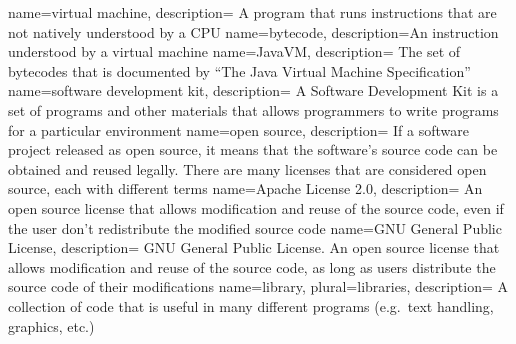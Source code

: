 {
    name={virtual machine},
    description=
    {
        A program that runs instructions that are not natively understood by a
        CPU
    }
}
{
    name=bytecode,
    description={An instruction understood by a virtual machine}
}
{
    name=JavaVM,
    description=
    {
        The set of bytecodes that is documented by ``The Java Virtual
        Machine Specification'' \cite{javavm-bytecode}
    }
}
{
    name={software development kit},
    description=
    {
        A Software Development Kit is a set of programs and other materials
        that allows programmers to write programs for a particular environment
    }
}
{
    name={open source},
    description=
    {
        If a software project released as open source, it means that the
        software's source code can be obtained and reused legally.  There are
        many licenses that are considered open source, each with different
        terms
    }
}
{
    name={Apache License 2.0},
    description=
    {
        An open source license that allows modification and reuse of the source
        code, even if the user don't redistribute the modified source code
        \cite{apache-license}
    }
}
{
    name={GNU General Public License},
    description=
    {
        GNU General Public License.  An open source license that allows
        modification and reuse of the source code, as long as users distribute
        the source code of their modifications \cite{gpl-license}
    }
}
{
    name=library,
    plural=libraries,
    description=
    {
        A collection of code that is useful in many different programs (e.g.\
        text handling, graphics, etc.)
    }
}
